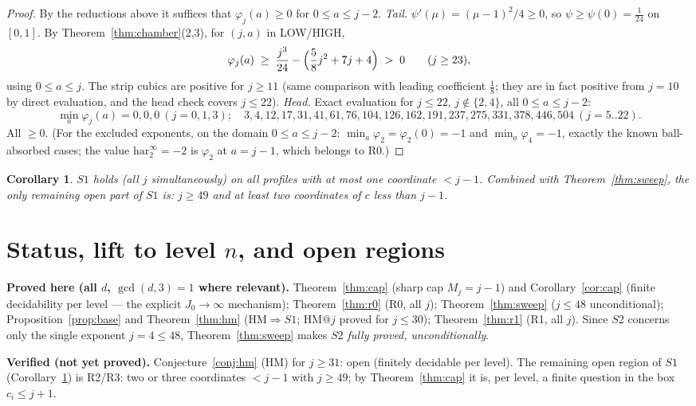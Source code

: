 \documentclass[11pt]{article}
\newtheorem{corollary}[theorem]{Corollary}
\theoremstyle{definition}
\theoremstyle{remark}
\newcommand{\har}{\mathrm{har}}
\newcommand{\haru}{\har^{\infty}}
\begin{document}
\begin{proof}
By the reductions above it suffices that $\varphi_j(a)\ge0$ for
$0\le a\le j-2$. \emph{Tail.} $\psi'(\mu)=(\mu-1)^2/4\ge0$, so
$\psi\ge\psi(0)=\tfrac1{24}$ on $[0,1]$. By
Theorem~\ref{thm:chamber}(2,3), for $(j,a)$ in LOW/HIGH,
\[
\varphi_j(a)\;\ge\;\frac{j^3}{24}-\Bigl(\frac58 j^2+7j+4\Bigr)\;>\;0
\qquad(j\ge23),
\]
using $0\le a\le j$. The strip cubics are positive for $j\ge11$ (same
comparison with leading coefficient $\tfrac18$; they are in fact positive
from $j=10$ by direct evaluation, and the head check covers $j\le22$). \emph{Head.} Exact
evaluation for $j\le22$, $j\notin\{2,4\}$, all $0\le a\le j-2$:
\[
\min_a\varphi_j(a)=0,0,0\ (j=0,1,3);\quad
3,4,12,17,31,41,61,76,104,126,162,191,237,275,331,378,446,504\ (j=5..22).
\]
All $\ge0$. (For the excluded exponents, on the domain
$0\le a\le j-2$: $\min_a\varphi_2=\varphi_2(0)=-1$ and
$\min_a\varphi_4=-1$, exactly the known ball-absorbed cases; the value
$\haru_2=-2$ is $\varphi_2$ at $a=j-1$, which belongs to R0.)
\end{proof}

\begin{corollary}\label{cor:status}
$S1$ holds (all $j$ simultaneously) on all profiles with at most one
coordinate $<j-1$. Combined with Theorem~\ref{thm:sweep}, the only remaining
open part of $S1$ is: $j\ge49$ \emph{and} at least two coordinates of $c$
less than $j-1$.
\end{corollary}

\section{Status, lift to level $n$, and open regions}

\textbf{Proved here (all $d$, $\gcd(d,3)=1$ where relevant).}
Theorem~\ref{thm:cap} (sharp cap $M_j=j-1$) and Corollary~\ref{cor:cap}
(finite decidability per level --- the explicit $J_0\to\infty$ mechanism);
Theorem~\ref{thm:r0} (R0, all $j$); Theorem~\ref{thm:sweep} ($j\le48$
unconditional); Proposition~\ref{prop:base} and Theorem~\ref{thm:hm}
($\mathrm{HM}\Rightarrow S1$; $\mathrm{HM}@j$ proved for $j\le30$);
Theorem~\ref{thm:r1} (R1, all $j$). Since $S2$ concerns only the single
exponent $j=4\le 48$, Theorem~\ref{thm:sweep} makes \emph{$S2$ fully
proved, unconditionally}.

\textbf{Verified (not yet proved).} Conjecture~\ref{conj:hm} (HM) for
$j\ge31$: open (finitely decidable per level). The remaining open region of
$S1$ (Corollary~\ref{cor:status}) is R2/R3: two or three coordinates
$<j-1$ with $j\ge49$; by Theorem~\ref{thm:cap} it is, per level, a finite
question in the box $c_i\le j+1$.
\end{document}
